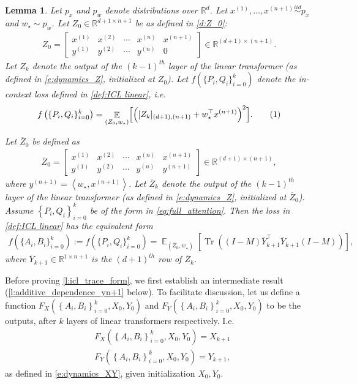 \documentclass{article}
\DeclareMathOperator{\E}{\mathbb{E}}
\newcommand{\R}{\mathbb{R}}
\newtheorem{lemma}{Lemma}
\newcommand{\wstar}{w_\star}
\newcommand{\tx}[1]{x^{(#1)}}
\newcommand{\ty}[1]{y^{(#1)}}
\DeclareMathOperator{\tr}{Tr}
\newcommand*\lin[1]{\left\langle #1 \right\rangle}
\newcommand*\lrb[1]{\left[ #1 \right]}
\newcommand*\lrp[1]{\left( #1 \right)}
\newcommand*\lrbb[1]{\left\{ #1 \right\}}
\newcommand\numberthis{\addtocounter{equation}{1}\tag{\theequation}}
\begin{document}
\begin{lemma}
\label{l:icl_trace_form}
Let $p_x$ and $p_w$ denote distributions over $\R^d$. Let $\tx{1},\dots,\tx{n+1} \overset{iid}{\sim} p_x$ and $\wstar \sim p_w$. Let $Z_0\in \R^{d+1\times n+1}$ be as defined in \eqref{d:Z_0}: 
\begin{align*}
Z_0 = \begin{bmatrix}
\tx{1} & \tx{2} & \cdots & \tx{n} &\tx{n+1} \\ 
\ty{1} & \ty{2} & \cdots &\ty{n}& 0
\end{bmatrix} \in \R^{(d+1) \times (n+1)}.
\end{align*}
Let $Z_k$ denote the output of the $(k-1)^{th}$ layer of the linear transformer (as defined in \eqref{e:dynamics_Z}, initialized at $Z_0$). Let $f\left(\{P_i, Q_i\}^{k}_{i=0}\right)$ denote the in-context loss defined in \eqref{def:ICL linear}, i.e.
\begin{align*}
f\left(\{P_i, Q_i\}^{k}_{i=0}\right) = \E_{(Z_0,\wstar)} \Bigl[ \left( [Z_{k}]_{(d+1),(n+1)} + \wstar^\top \tx{n+1}  \right)^2\Bigr].
\numberthis \label{e:old_icl}
\end{align*}

Let $\overline{Z}_0$ be defined as 
\begin{align*}
\overline{Z}_0 = \begin{bmatrix}
\tx{1} & \tx{2} & \cdots & \tx{n} &\tx{n+1} \\ 
\ty{1} & \ty{2} & \cdots &\ty{n}& \ty{n+1}
\end{bmatrix} \in \R^{(d+1) \times (n+1)},
\end{align*}
where $\ty{n+1} = \lin{\wstar, \tx{n+1}}$. Let $\overline{Z}_k$ denote the output of the $(k-1)^{th}$ layer of the linear transformer (as defined in \eqref{e:dynamics_Z}, initialized at $\overline{Z}_0$). Assume $\lrbb{P_i,Q_i}_{i=0}^k$ be of the form in \eqref{eq:full_attention}. Then the loss in \eqref{def:ICL linear} has the equivalent form
\begin{align*}
f\left(\{A_i, B_i\}^{k}_{i=0}\right) := f\left(\{P_i, Q_i\}^{k}_{i=0}\right) = \E_{(\overline{Z}_0,\wstar)} \lrb{\tr\lrp{\lrp{I-M}\overline{Y}_{k+1}^\top \overline{Y}_{k+1}\lrp{I-M}}},
\end{align*}
where $\overline{Y}_{k+1}\in\R^{1\times n+1}$ is the $(d+1)^{th}$ row of $\overline{Z}_k$.

\end{lemma}

Before proving \autoref{l:icl_trace_form}, we first establish an intermediate result (\autoref{l:additive_dependence_yn+1} below). To facilitate discussion, let us define a function $F_{X}\lrp{\lrbb{A_i,B_i}_{i=0}^k, X_0,Y_0}$ and $F_{Y}\lrp{\lrbb{A_i,B_i}_{i=0}^k, X_0,Y_0}$ to be the outputs, after $k$ layers of linear transformers respectively. I.e.
\begin{align*}
& F_{X}\lrp{\lrbb{A_i,B_i}_{i=0}^k, X_0,Y_0} = X_{k+1}\\
& F_{Y}\lrp{\lrbb{A_i,B_i}_{i=0}^k, X_0,Y_0} = Y_{k+1},
\end{align*}
as defined in \eqref{e:dynamics_XY}, given initialization $X_0,Y_0$.
\end{document}
